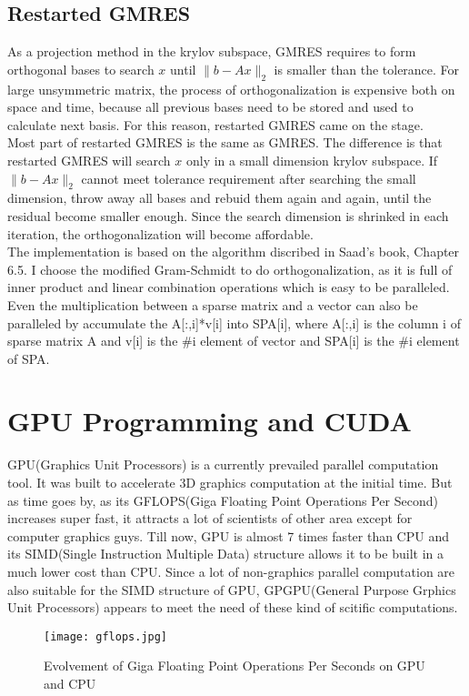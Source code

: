 \documentclass[12pt]{article}
\begin{document}
\subsection{Restarted GMRES}
As a projection method in the krylov subspace, GMRES requires to form orthogonal bases to search $x$ until $\|{b-Ax}\|_{2}$ is smaller than the tolerance. For large unsymmetric matrix, the process of orthogonalization is expensive both on space and time, because all previous bases need to be stored and used to calculate next basis. For this reason, restarted GMRES came on the stage.\\

Most part of restarted GMRES is the same as GMRES. The difference is that restarted GMRES will search $x$ only in a small dimension krylov subspace. If $\|{b-Ax}\|_{2}$ cannot meet tolerance requirement after searching the small dimension, throw away all bases and rebuid them again and again, until the residual become smaller enough. Since the search dimension is shrinked in each iteration, the orthogonalization will become affordable. \\

The implementation is based on the algorithm discribed in Saad's book, Chapter 6.5. I choose the modified Gram-Schmidt to do orthogonalization, as it is full of inner product and linear combination operations which is easy to be paralleled. Even the multiplication between a sparse matrix and a vector can also be paralleled by accumulate the A[:,i]*v[i] into SPA[i], where A[:,i] is the column i of sparse matrix A and v[i] is the \#i element of vector and SPA[i] is the \#i element of SPA. 

\section{GPU Programming and CUDA}
GPU(Graphics Unit Processors) is a currently prevailed parallel computation tool. It was built to accelerate 3D graphics computation at the initial time. But as time goes by, as its GFLOPS(Giga Floating Point Operations Per Second) increases super fast\label{gflops}, it attracts a lot of scientists of other area except for computer graphics guys. Till now, GPU is almost 7 times faster than CPU and its SIMD(Single Instruction Multiple Data) structure allows it to be built in a much lower cost than CPU. Since a lot of non-graphics parallel computation are also suitable for the SIMD structure of GPU, GPGPU(General Purpose Grphics Unit Processors) appears to meet the need of these kind of scitific computations. \\
\begin{figure}
    \centering
    \texttt{[image: gflops.jpg]}
    \caption{Evolvement of Giga Floating Point Operations Per Seconds on GPU and CPU}
    \label{gflops}
\end{figure}
\end{document}
